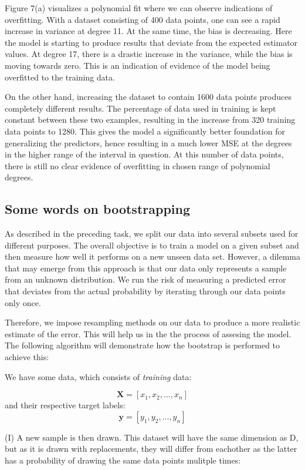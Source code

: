 \documentclass[11pt, a4paper]{article}
\begin{document}
Figure 7(a) visualizes a polynomial fit where we can observe indications of overfitting.  With a dataset consisting of 400 data points, one can see a rapid increase in variance at degree 11. At the same time, the bias is decreasing.  Here the model is starting to produce results that deviate from the expected estimator values. At degree 17, there is a drastic increase in the variance, while the bias is moving towards zero. This is an indication of evidence of the model being overfitted to the training data.

On the other hand, increasing the dataset to contain 1600 data points produces completely different results. The percentage of data used in training is kept constant between these two examples, resulting in the increase from 320 training data points to 1280. This gives the model a significantly better foundation for generalizing the predictors, hence resulting in a much lower MSE at the degrees in the higher range of the interval in question. At this number of data points, there is still no clear evidence of overfitting in chosen range of polynomial degrees.

\subsection*{Some words on bootstrapping}
As described in the preceding task, we split our data into several subsets used for different purposes. The overall objective is to train a model on a given subset and then measure how well it performs on a new unseen data set. However, a dilemma that may emerge from this approach is that our data only represents a sample from an unknown distribution. We run the risk of measuring a predicted error that deviates from the actual probability by iterating through our data points only once.

Therefore, we impose resampling methods on our data to produce a more realistic estimate of the error. This will help us in the the process of assesing the model. The following algorithm will demonstrate how the bootstrap is performed to achieve this:

We have some data, which consists of \emph{training} data:

$$\bm{X} = [x_1,x_2,...,x_n]$$
and their respective target labels:
$$\bm{y} = [y_1,y_2,...,y_n]$$


(I) A new sample is then drawn. This dataset will have the same dimension as D, but as it is drawn with replacements, they will differ from eachother as the latter has a probability of drawing the same data points mulitple times:
\end{document}
